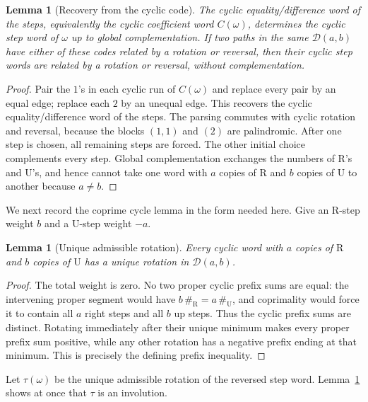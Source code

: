 \documentclass[11pt]{amsart}
\newtheorem{lemma}[theorem]{Lemma}
\theoremstyle{definition}
\newcommand{\RR}{\mathrm{R}}
\newcommand{\UU}{\mathrm{U}}
\newcommand{\cD}{\mathcal D}
\begin{document}
\begin{lemma}[Recovery from the cyclic code]\label{lem:code-recovery}
The cyclic equality/difference word of the steps, equivalently the cyclic
coefficient word $C(\omega)$, determines the cyclic step word of $\omega$ up
to global complementation.  If two paths in the same $\cD(a,b)$ have either
of these codes related by a rotation or reversal, then their cyclic step words
are related by a rotation or reversal, without complementation.
\end{lemma}

\begin{proof}
Pair the $1$'s in each cyclic run of $C(\omega)$ and replace every pair by an
equal edge; replace each $2$ by an unequal edge.  This recovers the cyclic
equality/difference word of the steps.  The parsing commutes with cyclic
rotation and reversal, because the blocks $(1,1)$ and $(2)$ are palindromic.
After one step is chosen, all remaining steps are forced.  The other initial
choice complements every step.  Global complementation exchanges the numbers
of $\RR$'s and $\UU$'s, and hence cannot take one word with $a$ copies of
$\RR$ and $b$ copies of $\UU$ to another because $a\ne b$.
\end{proof}

We next record the coprime cycle lemma in the form needed here.  Give an
$\RR$-step weight $b$ and a $\UU$-step weight $-a$.

\begin{lemma}[Unique admissible rotation]\label{lem:unique-rotation}
Every cyclic word with $a$ copies of $\RR$ and $b$ copies of $\UU$ has a
unique rotation in $\cD(a,b)$.
\end{lemma}

\begin{proof}
The total weight is zero.  No two proper cyclic prefix sums are equal: the
intervening proper segment would have
$b\,\#_{\RR}=a\,\#_{\UU}$, and coprimality would force it to contain all
$a$ right steps and all $b$ up steps.  Thus the cyclic prefix sums are
distinct.  Rotating immediately after their unique minimum makes every
proper prefix sum positive, while any other rotation has a negative prefix
ending at that minimum.  This is precisely the defining prefix inequality.
\end{proof}

Let $\tau(\omega)$ be the unique admissible rotation of the reversed step
word.  Lemma~\ref{lem:unique-rotation} shows at once that $\tau$ is an
involution.
\end{document}
